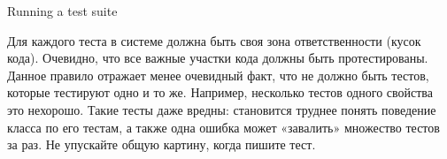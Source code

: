 \documentclass[a4paper,10pt,twoside]{book}
\begin{document}
\begin{method}[testsuiterun]{Running a test suite}
\begin{description}
Для каждого теста в системе должна быть своя зона ответственности (кусок кода).
Очевидно, что все важные участки кода должны быть протестированы.
Данное правило отражает менее очевидный факт, что не должно быть тестов, которые тестируют одно и то же.
Например, несколько тестов одного свойства это нехорошо. Такие тесты даже вредны:
становится труднее понять поведение класса по его тестам,
а также одна ошибка может «завалить» множество тестов за раз.
Не упускайте общую картину, когда пишите тест.
\end{description}





\end{method}
\end{document}

